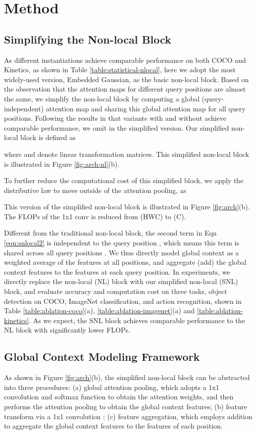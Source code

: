 \documentclass[10pt,twocolumn,letterpaper]{article}
\begin{document}
\section{Method}

\subsection{Simplifying the Non-local Block}
As different instantiations achieve comparable performance on both COCO and Kinetics, as shown in Table \ref{table:statistical-nlocal}, here we adopt the most widely-used version, Embedded Gaussian, as the basic non-local block.
Based on the observation that the attention maps for different query positions are almost the same, we simplify the non-local block by computing a global (query-independent) attention map and sharing this global attention map for all query positions. 
Following the results in \cite{hu2018relation} that variants with and without  achieve comparable performance, we omit  in the simplified version.
Our simplified non-local block is defined as

where  and  denote linear transformation matrices. 
This simplified non-local block is illustrated in Figure \ref{fig:arch-nl}(b).

To further reduce the computational cost of this simplified block, we apply the distributive law to move  outside of the attention pooling, as

This version of the simplified non-local block is illustrated in Figure \ref{fig:arch}(b). 
The FLOPs of the 1x1 conv  is reduced from (HWC) to (C).

Different from the traditional non-local block, the second term in Eqn \ref{eqn:snlocal2} is independent to the query position , which means this term is shared across all query positions . 
We thus directly model global context as a weighted average of the features at all positions, and aggregate (add) the global context features to the features at each query position.
In experiments, we directly replace the non-local (NL) block with our simplified non-local (SNL) block, and evaluate accuracy and computation cost on three tasks, object detection on COCO, ImageNet classification, and action recognition, shown in Table \ref{table:ablation-coco}(a), \ref{table:ablation-imagenet}(a) and \ref{table:ablation-kinetics}.
As we expect, the SNL block achieves comparable performance to the NL block with significantly lower FLOPs.


\subsection{Global Context Modeling Framework}
As shown in Figure \ref{fig:arch}(b), the simplified non-local block can be abstracted into three procedures: (a) global attention pooling, which adopts a 1x1 convolution  and softmax function to obtain the attention weights, and then performs the attention pooling to obtain the global context features; (b) feature transform via a 1x1 convolution ; (c) feature aggregation, which employs addition to aggregate the global context features to the features of each position.
\end{document}
